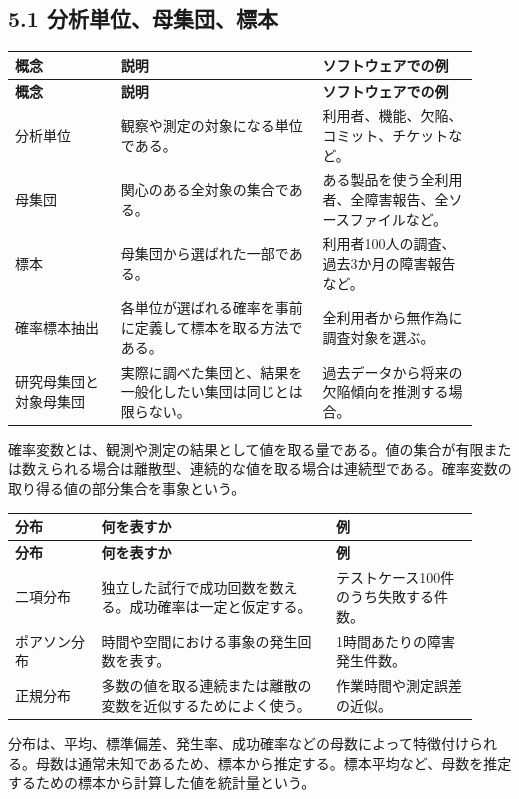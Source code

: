 \documentclass[uplatex,dvipdfmx,a4paper,11pt]{jsarticle}
\begin{document}
\subsection{5.1 分析単位、母集団、標本}
\begin{longtable}{>{\raggedright\arraybackslash}p{0.21\linewidth}>{\raggedright\arraybackslash}p{0.40\linewidth}>{\raggedright\arraybackslash}p{0.31\linewidth}}
\toprule
\textbf{概念} & \textbf{説明} & \textbf{ソフトウェアでの例} \\
\midrule
\endfirsthead
\toprule
\textbf{概念} & \textbf{説明} & \textbf{ソフトウェアでの例} \\
\midrule
\endhead
分析単位 & 観察や測定の対象になる単位である。 & 利用者、機能、欠陥、コミット、チケットなど。 \\
母集団 & 関心のある全対象の集合である。 & ある製品を使う全利用者、全障害報告、全ソースファイルなど。 \\
標本 & 母集団から選ばれた一部である。 & 利用者100人の調査、過去3か月の障害報告など。 \\
確率標本抽出 & 各単位が選ばれる確率を事前に定義して標本を取る方法である。 & 全利用者から無作為に調査対象を選ぶ。 \\
研究母集団と対象母集団 & 実際に調べた集団と、結果を一般化したい集団は同じとは限らない。 & 過去データから将来の欠陥傾向を推測する場合。 \\
\bottomrule
\end{longtable}
確率変数とは、観測や測定の結果として値を取る量である。値の集合が有限または数えられる場合は離散型、連続的な値を取る場合は連続型である。確率変数の取り得る値の部分集合を事象という。
\begin{longtable}{>{\raggedright\arraybackslash}p{0.17\linewidth}>{\raggedright\arraybackslash}p{0.46\linewidth}>{\raggedright\arraybackslash}p{0.29\linewidth}}
\toprule
\textbf{分布} & \textbf{何を表すか} & \textbf{例} \\
\midrule
\endfirsthead
\toprule
\textbf{分布} & \textbf{何を表すか} & \textbf{例} \\
\midrule
\endhead
二項分布 & 独立した試行で成功回数を数える。成功確率は一定と仮定する。 & テストケース100件のうち失敗する件数。 \\
ポアソン分布 & 時間や空間における事象の発生回数を表す。 & 1時間あたりの障害発生件数。 \\
正規分布 & 多数の値を取る連続または離散の変数を近似するためによく使う。 & 作業時間や測定誤差の近似。 \\
\bottomrule
\end{longtable}
分布は、平均、標準偏差、発生率、成功確率などの母数によって特徴付けられる。母数は通常未知であるため、標本から推定する。標本平均など、母数を推定するための標本から計算した値を統計量という。
\end{document}
